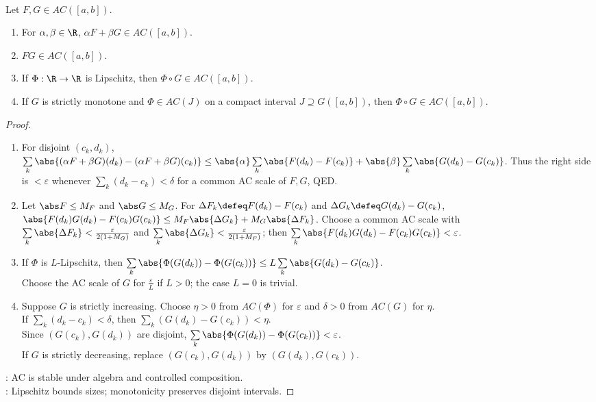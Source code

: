 \begin{proposition} \label{prop:absolute-continuity-algebra-and-composition} \\
Let $F,G\in AC([a,b])$.
\begin{enumerate}[label=(\roman*)]
\setlength{\itemsep}{0pt}
\item For $\alpha,\beta\in\R$, $\alpha F+\beta G\in AC([a,b])$.
\item $FG\in AC([a,b])$.
\item If $\Phi:\R\to\R$ is Lipschitz, then $\Phi\circ G\in AC([a,b])$.
\item If $G$ is strictly monotone and $\Phi\in AC(J)$ on a compact interval $J\supseteq G([a,b])$, then $\Phi\circ G\in AC([a,b])$.
\end{enumerate}
\begin{proof}
\begin{enumerate}[label=(\roman*)]
\setlength{\itemsep}{0pt}
\item For disjoint $(c_k,d_k)$, $\sum\limits_k\abs{(\alpha F+\beta G)(d_k)-(\alpha F+\beta G)(c_k)}\leq\abs{\alpha}\sum\limits_k\abs{F(d_k)-F(c_k)}+\abs{\beta}\sum\limits_k\abs{G(d_k)-G(c_k)}$. Thus the right side is $<\varepsilon$ whenever $\sum\limits_k(d_k-c_k)<\delta$ for a common AC scale of $F,G$, QED.
\item Let $\abs F\leq M_F$ and $\abs G\leq M_G$. For $\Delta F_k\defeq F(d_k)-F(c_k)$ and $\Delta G_k\defeq G(d_k)-G(c_k)$,\\
$\abs{F(d_k)G(d_k)-F(c_k)G(c_k)}\leq M_F\abs{\Delta G_k}+M_G\abs{\Delta F_k}$. Choose a common AC scale with\\
$\sum\limits_k\abs{\Delta F_k}<\frac{\varepsilon}{2(1+M_G)}$ and $\sum\limits_k\abs{\Delta G_k}<\frac{\varepsilon}{2(1+M_F)}$; then $\sum\limits_k\abs{F(d_k)G(d_k)-F(c_k)G(c_k)}<\varepsilon$.
\item If $\Phi$ is $L$-Lipschitz, then $\sum\limits_k\abs{\Phi(G(d_k))-\Phi(G(c_k))}\leq L\sum\limits_k\abs{G(d_k)-G(c_k)}$.\\
Choose the AC scale of $G$ for $\frac{\varepsilon}{L}$ if $L>0$; the case $L=0$ is trivial.
\item Suppose $G$ is strictly increasing. Choose $\eta>0$ from $AC(\Phi)$ for $\varepsilon$ and $\delta>0$ from $AC(G)$ for $\eta$.\\
If $\sum\limits_k(d_k-c_k)<\delta$, then $\sum\limits_k(G(d_k)-G(c_k))<\eta$.\\
Since $(G(c_k),G(d_k))$ are disjoint, $\sum\limits_k\abs{\Phi(G(d_k))-\Phi(G(c_k))}<\varepsilon$.\\
If $G$ is strictly decreasing, replace $(G(c_k),G(d_k))$ by $(G(d_k),G(c_k))$.
\end{enumerate}
: AC is stable under algebra and controlled composition.\\
: Lipschitz bounds sizes; monotonicity preserves disjoint intervals.
\end{proof}
\end{proposition}

